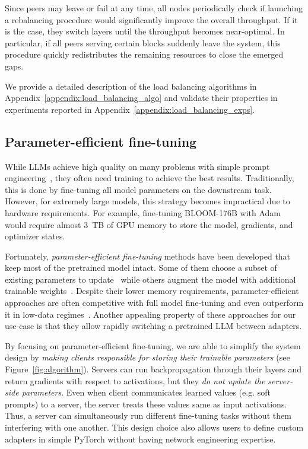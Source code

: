 Since peers may leave or fail at any time, all nodes periodically check if launching a rebalancing procedure would significantly improve the overall throughput. If it is the case, they switch layers until the throughput becomes near-optimal. In particular, if all peers serving certain blocks suddenly leave the system, this procedure quickly redistributes the remaining resources to close the emerged gaps.

We provide a detailed description of the load balancing algorithms in Appendix~\ref{appendix:load_balancing_algo} and validate their properties in experiments reported in Appendix~\ref{appendix:load_balancing_exps}.

\subsection{Parameter-efficient fine-tuning}\label{sect:fine-tuning}

While LLMs achieve high quality on many problems with simple prompt engineering~\citep{gpt3}, they often need training to achieve the best results. Traditionally, this is done by fine-tuning all model parameters on the downstream task.
However, for extremely large models, this strategy becomes impractical due to hardware requirements. For example, fine-tuning BLOOM-176B with Adam would require almost 3~TB of GPU memory to store the model, gradients, and optimizer states.

Fortunately, \textit{parameter-efficient fine-tuning} methods have been developed that keep most of the pretrained model intact. Some of them choose a subset of existing parameters to update~\citep{sung2021training,guo2021parameter} while others augment the model with additional trainable weights~\citep{hu2021lora, houlsby2019parameter, ptune-liu, ptune-lester, ptune-v2, tfew}. Despite their lower memory requirements, parameter-efficient approaches are often competitive with full model fine-tuning \citep{hu2021lora,ptune-v2,yong_adapting} and even outperform it in low-data regimes~\citep{2205.05638}. Another appealing property of these approaches for our use-case is that they allow rapidly switching a pretrained LLM between adapters.

By focusing on parameter-efficient fine-tuning, we are able to simplify the system design by \textit{making clients responsible for storing their trainable parameters} (see Figure~\ref{fig:algorithm}). Servers can run backpropagation through their layers and return gradients with respect to activations, but they \textit{do not update the server-side parameters}.
Even when client communicates learned values (e.g. soft prompts) to a server, the server treats these values same as input activations. Thus, a server can simultaneously run different fine-tuning tasks without them interfering with one another.
This design choice also allows users to define custom adapters in simple PyTorch without having network engineering expertise. %

